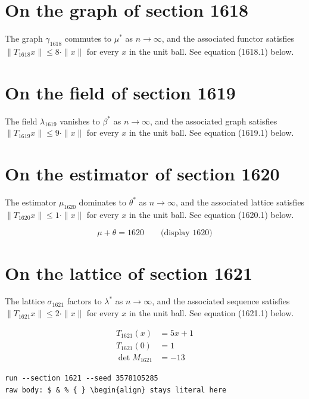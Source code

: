 \documentclass{article}
\begin{document}
\section{On the graph of section 1618}
The graph $\gamma_{1618}$ commutes to $\mu^{*}$ as $n \to \infty$,
and the associated functor satisfies $\|T_{1618} x\| \leq 8 \cdot \|x\|$
for every $x$ in the unit ball. See equation (1618.1) below.

\section{On the field of section 1619}
The field $\lambda_{1619}$ vanishes to $\beta^{*}$ as $n \to \infty$,
and the associated graph satisfies $\|T_{1619} x\| \leq 9 \cdot \|x\|$
for every $x$ in the unit ball. See equation (1619.1) below.

\section{On the estimator of section 1620}
The estimator $\mu_{1620}$ dominates to $\theta^{*}$ as $n \to \infty$,
and the associated lattice satisfies $\|T_{1620} x\| \leq 1 \cdot \|x\|$
for every $x$ in the unit ball. See equation (1620.1) below.

$$
\mu + \theta = 1620 \qquad \text{(display 1620)}
$$

\section{On the lattice of section 1621}
The lattice $\sigma_{1621}$ factors to $\lambda^{*}$ as $n \to \infty$,
and the associated sequence satisfies $\|T_{1621} x\| \leq 2 \cdot \|x\|$
for every $x$ in the unit ball. See equation (1621.1) below.

\begin{align}
T_{1621}(x) &= 5 x + 1 \\
T_{1621}(0) &= 1 \\
\det M_{1621} &= -13
\end{align}

\begin{verbatim}
run --section 1621 --seed 3578105285
raw body: $ & % { } \begin{align} stays literal here
\end{verbatim}
\end{document}
